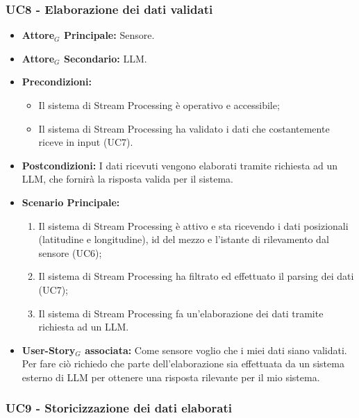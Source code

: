 \documentclass[11pt]{article}
\begin{document}
\begin{justify}
\begin{itemize}
\end{itemize}


\subsubsection{\textbf{UC8 - Elaborazione dei dati validati}}

\begin{itemize}
    \item \textbf{Attore$_G$ Principale:} Sensore.
    \item \textbf{Attore$_G$ Secondario:} LLM.
    \item \textbf{Precondizioni:} 
        \begin{itemize}
          \item Il sistema di Stream Processing è operativo e accessibile;
            \item Il sistema di Stream Processing ha validato i dati che costantemente riceve in input (UC7).
        \end{itemize}
      \item \textbf{Postcondizioni:} I dati ricevuti vengono elaborati tramite richiesta ad un LLM, che fornirà la risposta valida per il sistema.
    \item \textbf{Scenario Principale:} 
        \begin{enumerate}
        \item Il sistema di Stream Processing è attivo e sta ricevendo i dati posizionali (latitudine e longitudine), id del mezzo e l'istante di rilevamento dal sensore (UC6);
        \item Il sistema di Stream Processing ha filtrato ed effettuato il parsing dei dati (UC7);
        \item Il sistema di Stream Processing fa un'elaborazione dei dati tramite richiesta ad un LLM.
        \end{enumerate}
    \item \textbf{User-Story$_G$ associata:} Come sensore voglio che i miei dati siano validati. Per fare ciò richiedo che parte dell'elaborazione sia effettuata da un sistema esterno di LLM per ottenere una risposta rilevante per il mio sistema.
\end{itemize}


\subsubsection{\textbf{UC9 - Storicizzazione dei dati elaborati}}


\end{justify}
\end{document}
